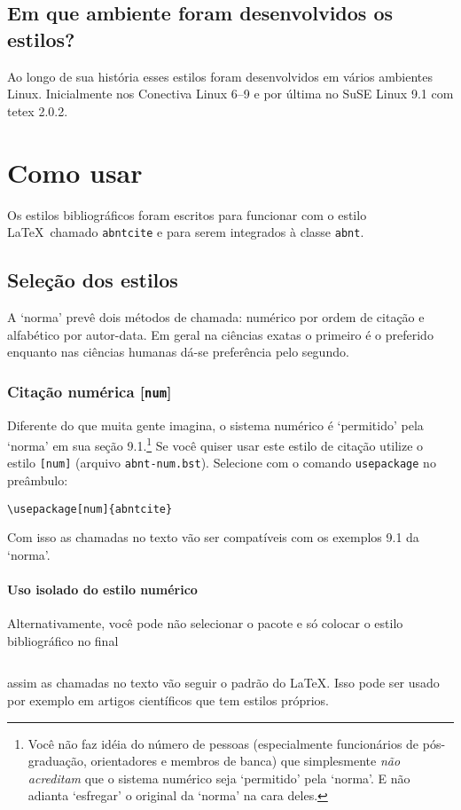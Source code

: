 \documentclass[espacosimples]{abnt}
\begin{document}
\section{Em que ambiente foram desenvolvidos os estilos?}

Ao longo de sua história esses estilos foram desenvolvidos em vários
ambientes Linux. Inicialmente nos Conectiva Linux 6--9 e por última
no SuSE Linux 9.1 com tetex 2.0.2.

\chapter{Como usar}

Os estilos bibliográficos foram escritos para funcionar com o estilo \LaTeX\
chamado {\tt abntcite} e para serem integrados à classe {\tt abnt}.

\section{Seleção dos estilos}

A `norma'\cite{NBR6023:2002} prevê dois métodos de chamada: numérico por ordem de citação
e alfabético por autor-data. Em geral na ciências exatas o primeiro é o preferido
enquanto nas ciências humanas dá-se preferência pelo segundo.

\subsection{Citação numérica [{\tt num}]}

Diferente do que muita gente imagina, o sistema numérico é
`permitido'  pela `norma'\cite{NBR6023:2002} em sua seção
9.1.\footnote{Você não faz idéia do número de pessoas (especialmente
funcionários de pós-graduação, orientadores e membros de banca) que simplesmente
\emph{não acreditam} que o sistema numérico seja `permitido' pela `norma'.
E não adianta `esfregar' o original da `norma' na cara deles.}
Se você quiser usar este estilo de citação utilize o estilo {\tt [num]} (arquivo
{\tt abnt-num.bst}).
Selecione com o comando \verb+usepackage+ no preâmbulo:
\begin{verbatim}
\usepackage[num]{abntcite}
\end{verbatim}
Com isso as chamadas no texto vão ser
compatíveis com os exemplos 9.1 da `norma'\cite{NBR6023:2000}.

\subsubsection{Uso isolado do estilo numérico}
Alternativamente, você pode não selecionar o pacote e só colocar
o estilo bibliográfico no final
\begin{verbatim}

\end{verbatim}
assim as chamadas no texto vão seguir o padrão do \LaTeX.
Isso pode ser usado por exemplo em artigos científicos que tem estilos 
próprios.
\end{document}
